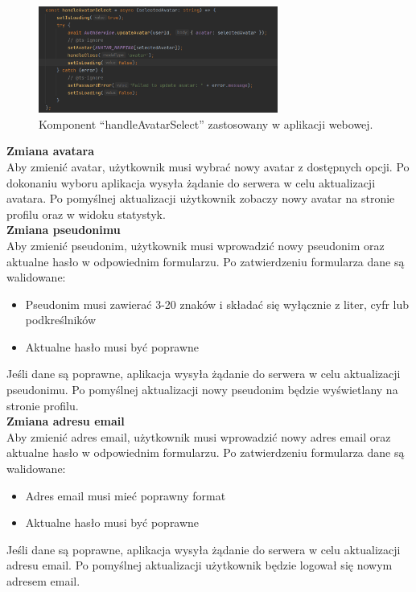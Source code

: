 \begin{figure}[H]
    \centering
    \includegraphics[width=0.7\textwidth]{chapters/chapter_8/screens/edit_user_web}
    \caption{Komponent “handleAvatarSelect” zastosowany w aplikacji webowej.}
    \label{img:edit_user_web}
\end{figure}

\textbf{Zmiana avatara}\\
Aby zmienić avatar, użytkownik musi wybrać nowy avatar z dostępnych opcji. Po dokonaniu wyboru aplikacja wysyła żądanie do serwera w celu aktualizacji avatara. Po pomyślnej aktualizacji użytkownik zobaczy nowy avatar na stronie profilu oraz w widoku statystyk.\\


\textbf{Zmiana pseudonimu}\\
Aby zmienić pseudonim, użytkownik musi wprowadzić nowy pseudonim oraz aktualne hasło w odpowiednim formularzu. Po zatwierdzeniu formularza dane są walidowane:
\begin{itemize}
    \item Pseudonim musi zawierać 3-20 znaków i składać się wyłącznie z liter, cyfr lub podkreślników
    \item Aktualne hasło musi być poprawne
\end{itemize}
Jeśli dane są poprawne, aplikacja wysyła żądanie do serwera w celu aktualizacji pseudonimu. Po pomyślnej aktualizacji nowy pseudonim będzie wyświetlany na stronie profilu.\\


\textbf{Zmiana adresu email}\\
Aby zmienić adres email, użytkownik musi wprowadzić nowy adres email oraz aktualne hasło w odpowiednim formularzu. Po zatwierdzeniu formularza dane są walidowane:
\begin{itemize}
    \item Adres email musi mieć poprawny format
    \item Aktualne hasło musi być poprawne
\end{itemize}
Jeśli dane są poprawne, aplikacja wysyła żądanie do serwera w celu aktualizacji adresu email. Po pomyślnej aktualizacji użytkownik będzie logował się nowym adresem email.\\


